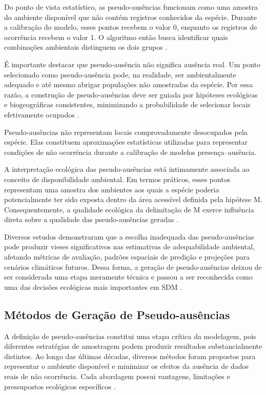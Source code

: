 Do ponto de vista estatístico, as pseudo-ausências funcionam como uma amostra do ambiente disponível que não contém registros conhecidos da espécie. Durante a calibração do modelo, esses pontos recebem o valor 0, enquanto os registros de ocorrência recebem o valor 1. O algoritmo então busca identificar quais combinações ambientais distinguem os dois grupos \citep{elith2009species}.

É importante destacar que pseudo-ausência não significa ausência real. Um ponto selecionado como pseudo-ausência pode, na realidade, ser ambientalmente adequado e até mesmo abrigar populações não amostradas da espécie. Por essa razão, a construção de pseudo-ausências deve ser guiada por hipóteses ecológicas e biogeográficas consistentes, minimizando a probabilidade de selecionar locais efetivamente ocupados \citep{peterson2011ecological}.

\begin{importantbox}
	Pseudo-ausências não representam locais comprovadamente desocupados pela espécie. Elas constituem aproximações estatísticas utilizadas para representar condições de não ocorrência durante a calibração de modelos presença--ausência.
\end{importantbox}

A interpretação ecológica das pseudo-ausências está intimamente associada ao conceito de disponibilidade ambiental. Em termos práticos, esses pontos representam uma amostra dos ambientes aos quais a espécie poderia potencialmente ter sido exposta dentro da área acessível definida pela hipótese M. Consequentemente, a qualidade ecológica da delimitação de M exerce influência direta sobre a qualidade das pseudo-ausências geradas \citep{barve2011crucial}.

Diversos estudos demonstraram que a escolha inadequada das pseudo-ausências pode produzir vieses significativos nas estimativas de adequabilidade ambiental, afetando métricas de avaliação, padrões espaciais de predição e projeções para cenários climáticos futuros. Dessa forma, a geração de pseudo-ausências deixou de ser considerada uma etapa meramente técnica e passou a ser reconhecida como uma das decisões ecológicas mais importantes em SDM \citep{zurell2020standard}.

\subsection{Métodos de Geração de Pseudo-ausências}

A definição de pseudo-ausências constitui uma etapa crítica da modelagem, pois diferentes estratégias de amostragem podem produzir resultados substancialmente distintos. Ao longo das últimas décadas, diversos métodos foram propostos para representar o ambiente disponível e minimizar os efeitos da ausência de dados reais de não ocorrência. Cada abordagem possui vantagens, limitações e pressupostos ecológicos específicos \citep{barbet2012selecting}.

